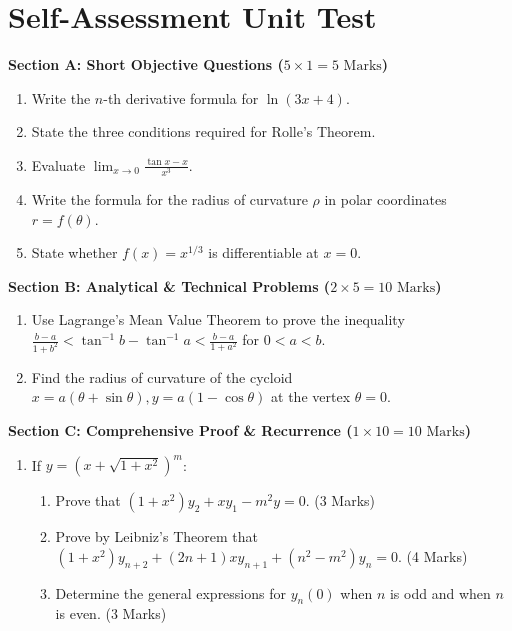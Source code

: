 \section{Self-Assessment Unit Test}

\begin{chaptertest}
\noindent\textbf{Section A: Short Objective Questions ($5 \times 1 = 5\text{ Marks}$)}
\begin{enumerate}[leftmargin=1.5em]
    \item Write the $n$-th derivative formula for $\ln(3x+4)$.
    \item State the three conditions required for Rolle's Theorem.
    \item Evaluate $\lim_{x\to 0} \frac{\tan x - x}{x^3}$.
    \item Write the formula for the radius of curvature $\rho$ in polar coordinates $r = f(\theta)$.
    \item State whether $f(x) = x^{1/3}$ is differentiable at $x = 0$.
\end{enumerate}

\medskip
\noindent\textbf{Section B: Analytical \& Technical Problems ($2 \times 5 = 10\text{ Marks}$)}
\begin{enumerate}[leftmargin=1.5em, start=6]
    \item Use Lagrange's Mean Value Theorem to prove the inequality $\frac{b-a}{1+b^2} < \tan^{-1}b - \tan^{-1}a < \frac{b-a}{1+a^2}$ for $0 < a < b$.
    \item Find the radius of curvature of the cycloid $x = a(\theta + \sin\theta), y = a(1 - \cos\theta)$ at the vertex $\theta = 0$.
\end{enumerate}

\medskip
\noindent\textbf{Section C: Comprehensive Proof \& Recurrence ($1 \times 10 = 10\text{ Marks}$)}
\begin{enumerate}[leftmargin=1.5em, start=8]
    \item If $y = (x + \sqrt{1+x^2})^m$:
    \begin{enumerate}[label=(\alph*)]
        \item Prove that $(1+x^2)y_2 + x y_1 - m^2 y = 0$. (3 Marks)
        \item Prove by Leibniz's Theorem that $(1+x^2)y_{n+2} + (2n+1)x y_{n+1} + (n^2-m^2)y_n = 0$. (4 Marks)
        \item Determine the general expressions for $y_n(0)$ when $n$ is odd and when $n$ is even. (3 Marks)
    \end{enumerate}
\end{enumerate}
\end{chaptertest}

